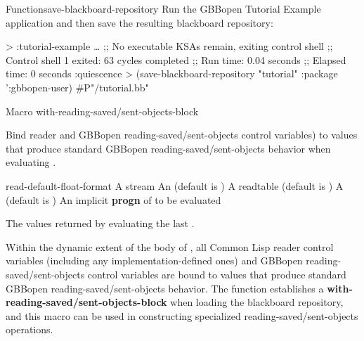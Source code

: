 \documentclass[10pt,twoside,english,pdftex]{article}
\begin{document}
\begin{functiondoc}{Function}{save-blackboard-repository}
\fnexample Run the GBBopen Tutorial Example application and then save the
resulting blackboard repository:
%
\W\supp
\begin{example}
  > :tutorial-example
      \textrm{\ldots{}}
  ;; No executable KSAs remain, exiting control shell
  ;; Control shell 1 exited: 63 cycles completed
  ;; Run time: 0.04 seconds
  ;; Elapsed time: 0 seconds
  :quiescence
  > (save-blackboard-repository "tutorial" :package ':gbbopen-user)
  #P"/tutorial.bb"
\end{example}

\end{functiondoc}


\begin{functiondoc}{Macro}%
  {with-reading-saved/sent-objects-block}%
  {\code{(} 
     \code{)}
    \superstar
    \returns{} \superstar}
  
\fnsyntax

\fnpurpose Bind reader and GBBopen reading-saved/sent-objects control
variables) to values that produce standard GBBopen
reading-saved/sent-objects behavior when evaluating .

\fnpackage {}

\fnmodule {}

\fnargs
\begin{args}{read-default-float-format}
\arg[stream] A stream
 An  (default is \nil)
\arg[readtable] A readtable (default is 
  )
 A  (default is \nil)
\arg[forms] An implicit \textbf{progn} of  to be evaluated
\end{args}

\fnreturns The values returned by evaluating the last .

\fndescription Within the dynamic extent of the body of ,
all Common Lisp reader control variables (including any
implementation-defined ones) and GBBopen reading-saved/sent-objects
control variables are bound to values that produce standard GBBopen
reading-saved/sent-objects behavior.  The function
\textbf{} establishes a
\textbf{with-reading-saved/sent-objects-block} when loading the
blackboard repository, and this macro can be used in constructing
specialized reading-saved/sent-objects operations.


\end{functiondoc}
\end{document}
